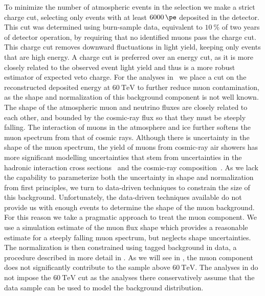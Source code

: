To minimize the number of atmospheric events in the selection we make a strict charge cut, selecting only events with at least $\SI{6000}\pe$ deposited in the detector.
This cut was determined using burn-sample data, equivalent to $\SI{10}\percent$ of two years of detector operation, by requiring that no identified muons pass the charge cut.
This charge cut removes downward fluctuations in light yield, keeping only events that are high energy.
A charge cut is preferred over an energy cut, as it is more closely related to the observed event light yield and thus is a more robust estimator of expected veto charge.
For the analyses in~ we place a cut on the reconstructed deposited energy at $\SI{60}\TeV$ to further reduce muon contamination, as the shape and normalization of this background component is not well known.
The shape of the atmospheric muon and neutrino fluxes are closely related to each other, and bounded by the cosmic-ray flux so that they must be steeply falling.
The interaction of muons in the atmosphere and ice further softens the muon spectrum from that of cosmic rays.
Although there is uncertainty in the shape of the muon spectrum, the yield of muons from cosmic-ray air showers has more significant modelling uncertainties that stem from uncertainties in the hadronic interaction cross sections~\cite{Pierog:2017nes} and the cosmic-ray composition~\cite{Bluemer:2009zf}.
As we lack the capability to parameterize both the uncertainty in shape and normalization from first principles, we turn to data-driven techniques to constrain the size of this background.
Unfortunately, the data-driven techniques available do not provide us with enough events to determine the shape of the muon background.
For this reason we take a pragmatic approach to treat the muon component.
We use a simulation estimate of the muon flux shape which provides a reasonable estimate for a steeply falling muon spectrum, but neglects shape uncertainties.
The normalization is then constrained using tagged background in data, a procedure described in more detail in .
As we will see in , the muon component does not significantly contribute to the sample above $\SI{60}\TeV$.
The analyses in  do not impose the $\SI{60}\TeV$ cut as the analyses there conservatively assume that the data sample can be used to model the background distribution.


